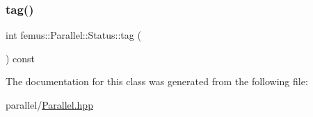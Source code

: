 \mbox{\label{classfemus_1_1_parallel_1_1_status_a3fa17871eee7b79ceba1b24d749ec690}} 
\subsubsection{\texorpdfstring{tag()}{tag()}}
{\footnotesize\ttfamily int femus\+::\+Parallel\+::\+Status\+::tag (\begin{DoxyParamCaption}{ }\end{DoxyParamCaption}) const\hspace{0.3cm}{\ttfamily [inline]}}



The documentation for this class was generated from the following file\+:\begin{DoxyCompactItemize}
\item 
parallel/\mbox{\hyperlink{_parallel_8hpp}{Parallel.\+hpp}}\end{DoxyCompactItemize}

